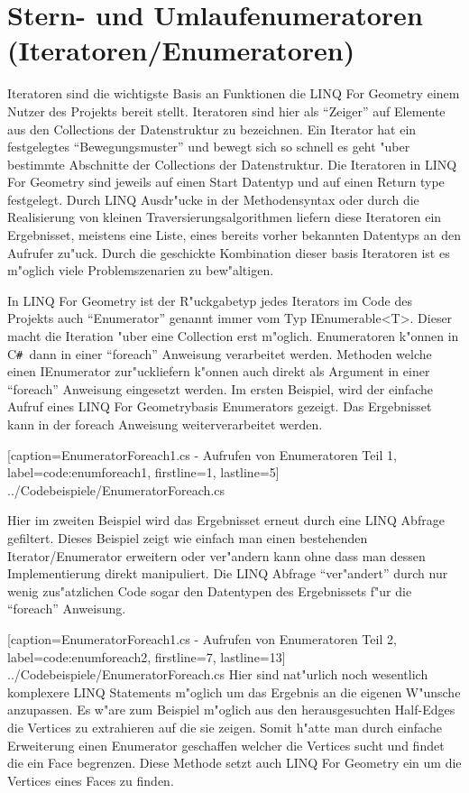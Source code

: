 \documentclass[pagesize, paper=a4, fontsize=12pt,titlepage=true, headings=small, headnosepline, abstractoff, liststotoc, nochapterprefix, plainheadsepline]{scrreprt}
\newcommand{\CSS}{C\texttt{\# }}
\newcommand{\LFG}{LINQ For Geometry}
\newcommand{\LFGS}{LINQ For Geometry }
\begin{document}
	\section {Stern- und Umlaufenumeratoren (Iteratoren/Enumeratoren)}
		Iteratoren sind die wichtigste Basis an Funktionen die \LFGS einem Nutzer des Projekts bereit stellt. Iteratoren sind hier als "`Zeiger"' auf Elemente aus den Collections der Datenstruktur zu bezeichnen. Ein Iterator hat ein festgelegtes "`Bewegungsmuster"' und bewegt sich so schnell es geht "uber bestimmte Abschnitte der Collections der Datenstruktur. Die Iteratoren in \LFGS sind jeweils auf einen Start Datentyp und auf einen Return type festgelegt. Durch LINQ Ausdr"ucke in der Methodensyntax oder durch die Realisierung von kleinen Traversierungsalgorithmen liefern diese Iteratoren ein Ergebnisset, meistens eine Liste, eines bereits vorher bekannten Datentyps an den Aufrufer zu"uck. Durch die geschickte Kombination dieser basis Iteratoren ist es m"oglich viele Problemszenarien zu bew"altigen.

In \LFGS ist der R"uckgabetyp jedes Iterators im Code des Projekts auch "`Enumerator"' genannt immer vom Typ IEnumerable<T>. Dieser macht die Iteration "uber eine Collection erst m"oglich. Enumeratoren k"onnen in \CSS dann in einer "`foreach"' Anweisung verarbeitet werden. Methoden welche einen IEnumerator zur"uckliefern k"onnen auch direkt als Argument in einer "`foreach"' Anweisung eingesetzt werden.
Im ersten Beispiel, wird der einfache Aufruf eines \LFG basis Enumerators gezeigt. Das Ergebnisset kann in der foreach Anweisung weiterverarbeitet werden.


			[caption={EnumeratorForeach1.cs - Aufrufen von Enumeratoren Teil 1}, label=code:enumforeach1, firstline=1, lastline=5]
			{../Codebeispiele/EnumeratorForeach.cs}

Hier im zweiten Beispiel wird das Ergebnisset erneut durch eine LINQ Abfrage gefiltert. Dieses Beispiel zeigt wie einfach man einen bestehenden Iterator/Enumerator erweitern oder ver"andern kann ohne dass man dessen Implementierung direkt manipuliert. Die LINQ Abfrage "`ver"andert"' durch nur wenig zus"atzlichen Code sogar den Datentypen des Ergebnissets f"ur die "`foreach"' Anweisung.

			[caption={EnumeratorForeach1.cs - Aufrufen von Enumeratoren Teil 2}, label=code:enumforeach2, firstline=7, lastline=13]
			{../Codebeispiele/EnumeratorForeach.cs}
Hier sind nat"urlich noch wesentlich komplexere LINQ Statements m"oglich um das Ergebnis an die eigenen W"unsche anzupassen. Es w"are zum Beispiel m"oglich aus den herausgesuchten Half-Edges die Vertices zu extrahieren auf die sie zeigen. Somit h"atte man durch einfache Erweiterung einen Enumerator geschaffen welcher die Vertices sucht und findet die ein Face begrenzen. Diese Methode setzt auch \LFGS ein um die Vertices eines Faces zu finden.
\newline
\end{document}
